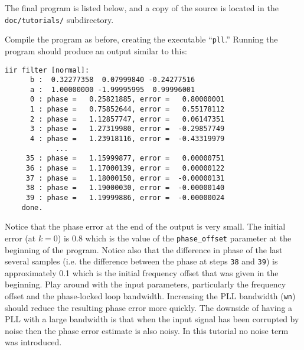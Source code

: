 The final program is listed below,
and a copy of the source is located in the {\tt doc/tutorials/}
subdirectory.
%

%
Compile the program as before, creating the executable ``{\tt pll}.''
Running the program should produce an output similar to this:
\begin{Verbatim}[fontsize=\small]
    iir filter [normal]:
      b :  0.32277358  0.07999840 -0.24277516
      a :  1.00000000 -1.99995995  0.99996001
      0 : phase =   0.25821885, error =   0.80000001
      1 : phase =   0.75852644, error =   0.55178112
      2 : phase =   1.12857747, error =   0.06147351
      3 : phase =   1.27319980, error =  -0.29857749
      4 : phase =   1.23918116, error =  -0.43319979
            ...
     35 : phase =   1.15999877, error =   0.00000751
     36 : phase =   1.17000139, error =   0.00000122
     37 : phase =   1.18000150, error =  -0.00000131
     38 : phase =   1.19000030, error =  -0.00000140
     39 : phase =   1.19999886, error =  -0.00000024
    done.
\end{Verbatim}
%
Notice that the phase error at the end of the output is very small.
The initial error (at $k=0$) is 0.8 which is the value of the
{\tt phase\_offset} parameter at the beginning of the program.
Notice also that the difference in phase of the last several samples
(i.e. the difference between the phase at steps {\tt 38} and {\tt 39})
is approximately 0.1 which is the initial frequency offset that was
given in the beginning.
Play around with the input parameters, particularly the frequency offset
and the phase-locked loop bandwidth.
Increasing the PLL bandwidth ({\tt wn}) should reduce the resulting
phase error more quickly.
The downside of having a PLL with a large bandwidth is that when the
input signal has been corrupted by noise then the phase error estimate
is also noisy.
In this tutorial no noise term was introduced. %

